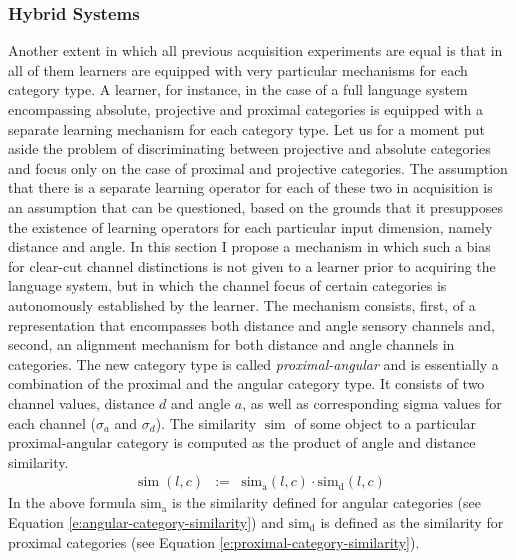 \subsubsection*{Hybrid Systems}
Another extent in which all previous acquisition experiments are equal is that
in all of them learners are equipped with very particular mechanisms for 
each category type. A learner, for instance, in the case of a full language 
system encompassing absolute, projective and proximal categories is equipped 
with a separate learning mechanism for each 
category type. Let us for a moment put aside the problem of discriminating
between projective and absolute categories and focus only on the case of 
proximal and projective categories. The assumption that there is a separate
learning operator for each of these two in acquisition is an assumption that can be 
questioned, based on the grounds that it presupposes the existence
of learning operators for each particular input dimension, namely distance and angle. 
In this section I propose a mechanism in which such a bias for clear-cut 
channel distinctions is not given to a learner prior to acquiring
the language system, but in which the channel focus of certain categories
is autonomously established by the learner. The mechanism consists, first, of 
a representation that encompasses both distance and angle sensory channels and, second, 
an alignment mechanism for both distance and angle channels in categories.
The new category type is called \emph{proximal-angular} and is essentially a combination
of the proximal and the angular category type. It consists of two channel values, 
distance $d$ and angle $a$, as well as corresponding sigma values for each channel
($\sigma_a$ and $\sigma_d$).
The similarity $\operatorname{sim}$ of some object to a 
particular proximal-angular category 
is computed as the product of angle and distance similarity.
\begin{eqnarray}
\label{e:proximal-angular-similarity}
\operatorname{sim}(l,c)&:=& \operatorname{sim_a}(l,c) \cdot \operatorname{sim_d}(l,c)
\end{eqnarray}
In the above formula $\operatorname{sim_a}$ is the similarity defined for  angular categories 
(see Equation \ref{e:angular-category-similarity}) and $\operatorname{sim_d}$ is defined
as the similarity for proximal categories (see Equation \ref{e:proximal-category-similarity}).

